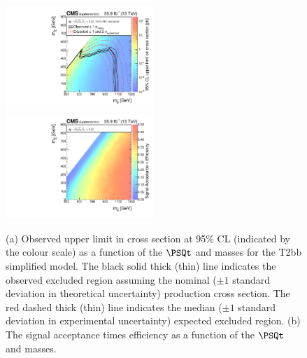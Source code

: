 \begin{figure}
    \begin{center}
            \includegraphics[width=0.50\textwidth]{Supplementary/T2bbXSEC}
            \includegraphics[width=0.50\textwidth]{Supplementary/T2bb_efficiency_aux}
        \caption{ (a) Observed upper limit in cross section at 95\% CL (indicated
        by the colour scale) as a function of 
        the $\PSQt$ and \PSGczDo %
        masses for the 
        T2bb %
        simplified  model.  The  black  solid thick  (thin)  line indicates  the
        observed  excluded  region  assuming   the  nominal  (${\pm}1$  standard
        deviation in theoretical uncertainty)  production cross section. The red
        dashed  thick  (thin)  line  indicates  the  median  (${\pm}1$  standard
        deviation in experimental uncertainty) expected excluded region.
        (b) The signal acceptance times efficiency as a function of 
        the $\PSQt$ and \PSGczDo %
        masses.
        }
        \label{fig:T2bb}
    \end{center}
\end{figure}

